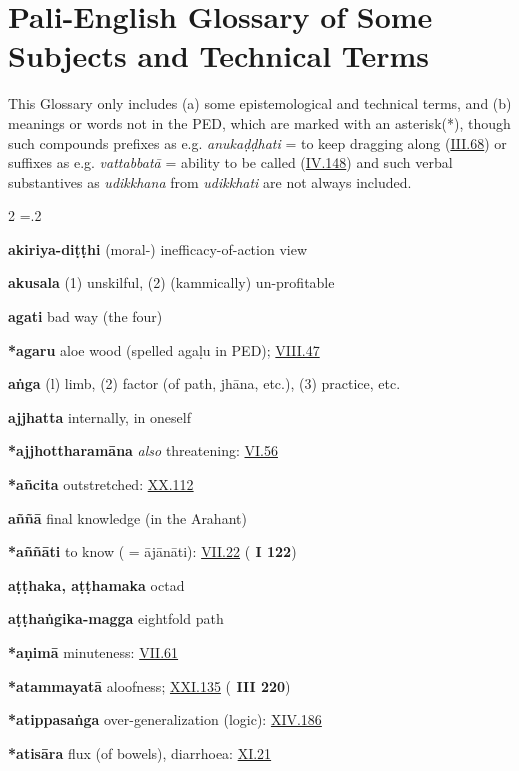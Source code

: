 \chapter[Pali-English Glossary]{Pali-English Glossary\* {\large of Some Subjects and Technical Terms}}This Glossary only includes (a) some epistemological and technical terms, and (b) meanings or words not in the PED, which are marked with an asterisk(*), though such compounds prefixes as e.g. \emph{anukaḍḍhati} = to keep dragging along (\hyperlink{III.68}{III.68}{}) or suffixes as e.g. \emph{vattabbatā} = ability to be called (\hyperlink{IV.148}{IV.148}{}) and such verbal substantives as \emph{udikkhana} from \emph{udikkhati} are not always included.\begin{multicols}{2}
\parskip=.2\baselineskip\RaggedRight\begin{vismHanging}
\par\textbf{akiriya-diṭṭhi} (moral-) inefficacy-of-action view 
\par\textbf{akusala} (1) unskilful, (2) (kammically) un-profitable 
\par\textbf{agati} bad way (the four)
\par\textbf{*agaru} aloe wood (spelled agaḷu in PED); \hyperlink{VIII.47}{VIII.47}{} 
\par\textbf{aṅga} (l) limb, (2) factor (of path, jhāna, etc.), (3) practice, etc. 
\par\textbf{ajjhatta} internally, in oneself
\par\textbf{*ajjhottharamāna} \emph{also }threatening: \hyperlink{VI.56}{VI.56}{}
\par\textbf{*añcita} outstretched: \hyperlink{XX.112}{XX.112}{}
\par\textbf{aññā} final knowledge (in the Arahant)
\par\textbf{*aññāti} to know ( = ājānāti): \hyperlink{VII.22}{VII.22}{} (\textbf{\cite{Paṭis} I 122}) 
\par\textbf{aṭṭhaka, aṭṭhamaka} octad
\par\textbf{aṭṭhaṅgika-magga} eightfold path
\par\textbf{*aṇimā} minuteness: \hyperlink{VII.61}{VII.61}{}
\par\textbf{*atammayatā} aloofness; \hyperlink{XXI.135}{XXI.135}{} (\textbf{\cite{M} III 220}) 
\par\textbf{*atippasaṅga} over-generalization (logic): \hyperlink{XIV.186}{XIV.186}{} 
\par\textbf{*atisāra} flux (of bowels), diarrhoea: \hyperlink{XI.21}{XI.21}{}

\end{vismHanging}
\end{multicols}
